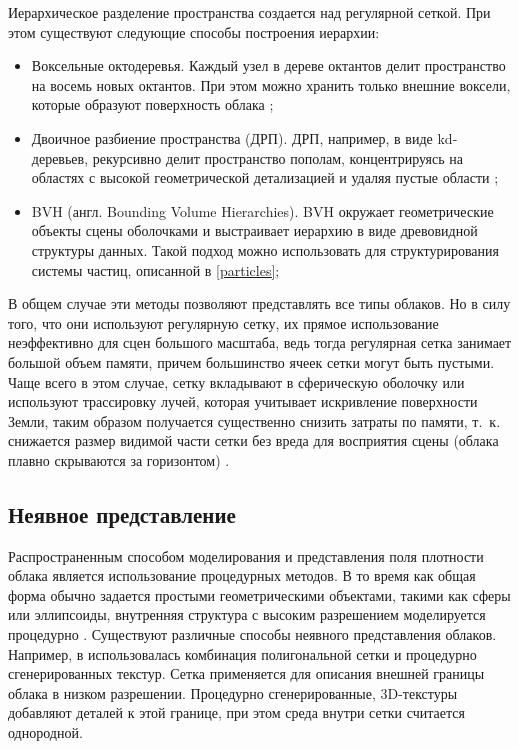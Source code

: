 Иерархическое разделение пространства создается над регулярной сеткой. При этом существуют следующие способы построения иерархии:
\begin{itemize}
	\item Воксельные октодеревья. Каждый узел в дереве октантов делит пространство на восемь новых октантов. При этом можно хранить только внешние воксели, которые образуют поверхность облака \cite{clouds};
	\item Двоичное разбиение пространства (ДРП). ДРП, например, в виде kd-деревьев, рекурсивно делит пространство пополам, концентрируясь на областях с высокой геометрической детализацией и удаляя пустые области \cite{clouds};
	\item BVH (англ. Bounding Volume Hierarchies). BVH окружает геометрические объекты сцены оболочками и выстраивает иерархию в виде древовидной структуры данных. Такой подход можно использовать для структурирования системы частиц, описанной в \ref{particles};
\end{itemize}

 В общем случае эти методы позволяют представлять все типы облаков. Но в силу того, что они используют регулярную сетку, их прямое использование неэффективно для сцен большого масштаба, ведь тогда регулярная сетка занимает большой объем памяти, причем большинство ячеек сетки могут быть пустыми. Чаще всего в этом случае, сетку вкладывают в сферическую оболочку или используют трассировку лучей, которая учитывает искривление поверхности Земли, таким образом получается существенно снизить затраты по памяти, т.~к. снижается размер видимой части сетки без вреда для восприятия сцены (облака плавно скрываются за горизонтом) \cite{clouds}.


\subsection{Неявное представление} 
\label{implicit}
Распространенным способом моделирования и представления поля плотности облака является использование процедурных методов. В то время как общая форма обычно задается простыми геометрическими объектами, такими как сферы или эллипсоиды, внутренняя структура с высоким разрешением моделируется процедурно \cite{clouds}. Существуют различные способы неявного представления облаков. Например, в \cite{implicit} использовалась комбинация полигональной сетки и процедурно сгенерированных текстур. Сетка применяется для описания внешней границы облака в низком разрешении. Процедурно сгенерированные, 3D-текстуры добавляют деталей к этой границе, при этом среда внутри сетки считается однородной.

